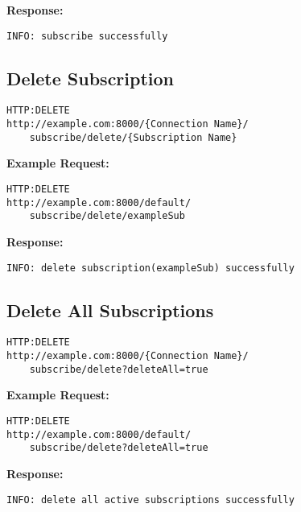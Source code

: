 \begin{minipage}{\linewidth}
\textbf{Response:}
\begin{lstlisting}
INFO: subscribe successfully
\end{lstlisting}
\end{minipage}

\subsection{Delete Subscription}
\begin{lstlisting}
HTTP:DELETE
http://example.com:8000/{Connection Name}/
	subscribe/delete/{Subscription Name}
\end{lstlisting}

\begin{minipage}{\linewidth}
\textbf{Example Request:}
\begin{lstlisting}
HTTP:DELETE
http://example.com:8000/default/
	subscribe/delete/exampleSub
\end{lstlisting}
\end{minipage}

\begin{minipage}{\linewidth}
\textbf{Response:}
\begin{lstlisting}
INFO: delete subscription(exampleSub) successfully
\end{lstlisting}
\end{minipage}

\subsection{Delete All Subscriptions}
\begin{lstlisting}
HTTP:DELETE
http://example.com:8000/{Connection Name}/
	subscribe/delete?deleteAll=true
\end{lstlisting}

\begin{minipage}{\linewidth}
\textbf{Example Request:}
\begin{lstlisting}
HTTP:DELETE
http://example.com:8000/default/
	subscribe/delete?deleteAll=true
\end{lstlisting}
\end{minipage}

\begin{minipage}{\linewidth}
\textbf{Response:}
\begin{lstlisting}
INFO: delete all active subscriptions successfully
\end{lstlisting}
\end{minipage}